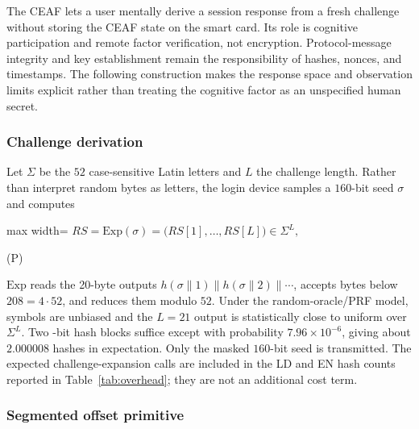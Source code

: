 \documentclass[cmc,article,submit,moreauthors,pdftex]{Definitions/tsp}
\renewcommand{\mathsf}[1]{\mathrm{#1}}
\newcommand{\cc}{\mathbin{\|}}
\newcounter{protoeq} %
\newenvironment{ceq}{%
  \refstepcounter{protoeq}%
  \par\vspace{-3pt}\setlength{\topsep}{0pt}\setlength{\partopsep}{0pt}\begin{center}%
}{%
  \hspace{0.45em}\textup{(P\theprotoeq)}%
  \end{center}\vspace{-3pt}%
} %
\providecommand{\DIFadd}[1]{{\protect\color{blue} \sf #1}} %
\providecommand{\DIFaddbegin}{} %
\providecommand{\DIFaddend}{} %
\providecommand{\DIFdelbegin}{} %
\providecommand{\DIFdelend}{} %
\begin{document}
The CEAF lets a user mentally derive a session response from a fresh challenge without storing the CEAF state on the smart card. Its role is cognitive participation and remote factor verification, not encryption. Protocol-message integrity and key establishment remain the responsibility of hashes, nonces, and timestamps. The following construction makes the response space and observation limits explicit rather than treating the cognitive factor as an unspecified human secret.

\subsubsection{Challenge derivation}\label{sec:challenge}

Let $\Sigma$ be the $52$ case-sensitive Latin letters and $L$ the challenge length. Rather than interpret random bytes as letters, the login device samples a $160$-bit seed $\sigma$ and computes

\DIFdelbegin %
\DIFdelend \DIFaddbegin \begin{ceq}
\DIFaddend \begin{adjustbox}{max width=\columnwidth}
$\displaystyle RS = \mathsf{Exp}(\sigma) = \bigl(RS[1],\dots,RS[L]\bigr)\in\Sigma^{L},$
\end{adjustbox}
\DIFdelbegin %
\DIFdelend \DIFaddbegin \end{ceq}
\DIFaddend 

$\mathsf{Exp}$ reads \DIFaddbegin \DIFadd{the 20-byte outputs }\DIFaddend $h(\sigma\cc1)\cc h(\sigma\cc2)\cc\cdots$, accepts bytes below $208=4\cdot52$, and reduces them modulo $52$. Under the random-oracle/PRF model, symbols are unbiased and the $L=21$ output is statistically close to uniform over $\Sigma^L$. Two \DIFaddbegin \DIFadd{160-bit }\DIFaddend hash blocks suffice except with probability $7.96\times10^{-6}$, giving about $2.000008$ hashes in expectation. Only the masked $160$-bit seed is transmitted. \DIFaddbegin \DIFadd{The expected challenge-expansion calls are included in the LD and EN hash counts reported in Table~\ref{tab:overhead}; they are not an additional cost term.
}\DIFaddend 

\subsubsection{Segmented offset primitive}
\end{document}
